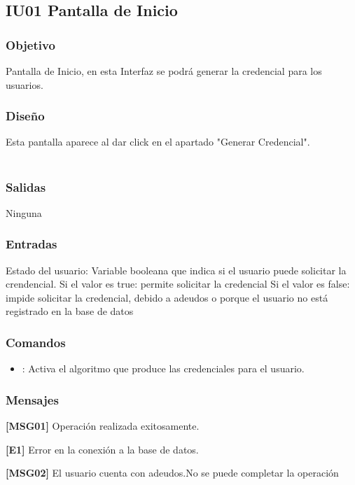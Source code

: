 \newpage
\subsection{IU01 Pantalla de Inicio}

\subsubsection{Objetivo}
	Pantalla de Inicio, en esta Interfaz se podrá generar la credencial para los usuarios.

\subsubsection{Diseño}
	Esta pantalla aparece al dar click en el apartado "Generar Credencial".  \\\\


\subsubsection{Salidas}
	\begin{Citemize}
		\item Ninguna
	\end{Citemize}
	
\subsubsection{Entradas}
	\begin{Citemize}
		\item Estado del usuario: Variable booleana que indica si el usuario puede solicitar la crendencial. 
		Si el valor es true: permite solicitar la credencial
		Si el valor es false: impide solicitar la credencial, debido a adeudos o porque el usuario no está registrado en la 				base de datos
	\end{Citemize}

\subsubsection{Comandos}
\begin{itemize}
	\item {}: Activa el algoritmo que produce las credenciales para el usuario.
\end{itemize}

\subsubsection{Mensajes}
	\begin{Citemize}
		\item {\bf [MSG01]} Operación realizada exitosamente. 
		\item {\bf [E1]} Error en la conexión a la base de datos.
		\item {\bf [MSG02]} El usuario cuenta con adeudos.No se puede completar la operación
	\end{Citemize}